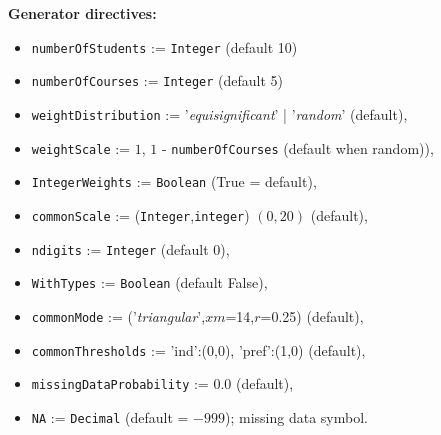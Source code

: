\noindent \textbf{Generator directives:}
\begin{itemize}[leftmargin=0.5cm,rightmargin=0.5cm,topsep=1pt]
\item \texttt{numberOfStudents} := \texttt{Integer} (default 10)
\item \texttt{numberOfCourses} := \texttt{Integer} (default 5)
\item \texttt{weightDistribution} := '\emph{equisignificant}' | '\emph{random}' (default),
\item \texttt{weightScale} := $1$, $1$ - \texttt{numberOfCourses} (default when random)),
\item \texttt{IntegerWeights} := \texttt{Boolean} (True = default),
\item \texttt{commonScale} := (\texttt{Integer},\texttt{integer}) $(0,20)$ (default),
\item \texttt{ndigits} := \texttt{Integer} (default 0),
\item \texttt{WithTypes} := \texttt{Boolean} (default False),
\item \texttt{commonMode} := ('\emph{triangular}',$xm$=14,$r$=0.25) (default),
\item \texttt{commonThresholds} := {'ind':(0,0), 'pref':(1,0)} (default),
\item \texttt{missingDataProbability} := 0.0 (default),
\item \texttt{NA} := \texttt{Decimal} (default = $-999$); missing data symbol. 
\end{itemize}      

